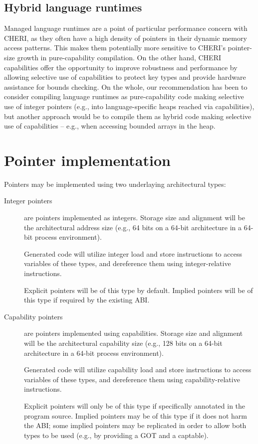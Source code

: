 \documentclass[12pt,twoside,openright,a4paper]{article}
\begin{document}
\subsection{Hybrid language runtimes}

Managed language runtimes are a point of particular performance concern with
CHERI, as they often have a high density of pointers in their dynamic memory
access patterns.
This makes them potentially more sensitive to CHERI's pointer-size growth in
pure-capability compilation.
On the other hand, CHERI capabilities offer the opportunity to improve
robustness and performance by allowing selective use of capabilities to
protect key types and provide hardware assistance for bounds checking.
On the whole, our recommendation has been to consider compiling language
runtimes as pure-capability code making selective use of integer pointers
(e.g., into language-specific heaps reached via capabilities), but
another approach would be to compile them as hybrid code making selective use
of capabilities -- e.g., when accessing bounded arrays in the heap.

\section{Pointer implementation}

Pointers may be implemented using two underlaying architectural types:

\begin{description}
\item[Integer pointers] are pointers implemented as integers.
  Storage size and alignment will be the architectural address size (e.g.,
  64 bits on a 64-bit architecture in a 64-bit process environment).

  Generated code will utilize integer load and store instructions to access
  variables of these types, and dereference them using integer-relative
  instructions.

  Explicit pointers will be of this type by default.
  Implied pointers will be of this type if required by the existing ABI.

\item[Capability pointers] are pointers implemented using capabilities.
  Storage size and alignment will be the architectural capability size (e.g.,
  128 bits on a 64-bit architecture in a 64-bit process environment).

  Generated code will utilize capability load and store instructions to access
  variables of these types, and dereference them using capability-relative
  instructions.

  Explicit pointers will only be of this type if specifically annotated in the
  program source.
  Implied pointers may be of this type if it does not harm the ABI; some
  implied pointers may be replicated in order to allow both types to be used
  (e.g., by providing a GOT and a captable).
\end{description}
\end{document}
